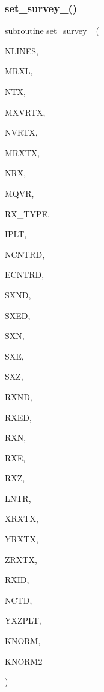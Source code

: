 \subsubsection{\texorpdfstring{set\+\_\+survey\+\_()}{set\_survey\_1()}}
{\footnotesize\ttfamily subroutine set\+\_\+survey\+\_ (\begin{DoxyParamCaption}\item[{integer}]{N\+L\+I\+N\+ES,  }\item[{integer}]{M\+R\+XL,  }\item[{integer}]{N\+TX,  }\item[{integer}]{M\+X\+V\+R\+TX,  }\item[{integer, dimension(ntx)}]{N\+V\+R\+TX,  }\item[{integer}]{M\+R\+X\+TX,  }\item[{integer, dimension (nlines)}]{N\+RX,  }\item[{integer}]{M\+Q\+VR,  }\item[{integer, dimension (nlines)}]{R\+X\+\_\+\+T\+Y\+PE,  }\item[{integer, dimension (nlines)}]{I\+P\+LT,  }\item[{real(kind=ql)}]{N\+C\+N\+T\+RD,  }\item[{real(kind=ql)}]{E\+C\+N\+T\+RD,  }\item[{real(kind=ql), dimension(mxvrtx,ntx)}]{S\+X\+ND,  }\item[{real(kind=ql), dimension(mxvrtx,ntx)}]{S\+X\+ED,  }\item[{real, dimension(mxvrtx,ntx)}]{S\+XN,  }\item[{real, dimension(mxvrtx,ntx)}]{S\+XE,  }\item[{real, dimension(ntx)}]{S\+XZ,  }\item[{real(kind=ql), dimension(mrxl,nlines,mqvr)}]{R\+X\+ND,  }\item[{real(kind=ql), dimension(mrxl,nlines,mqvr)}]{R\+X\+ED,  }\item[{real, dimension(mrxl,nlines,mqvr)}]{R\+XN,  }\item[{real, dimension(mrxl,nlines,mqvr)}]{R\+XE,  }\item[{real, dimension(mrxl,nlines)}]{R\+XZ,  }\item[{integer, dimension(4,nlines)}]{L\+N\+TR,  }\item[{real, dimension(mrxtx,ntx,mqvr)}]{X\+R\+X\+TX,  }\item[{real, dimension(mrxtx,ntx,mqvr)}]{Y\+R\+X\+TX,  }\item[{real, dimension(mrxtx,ntx)}]{Z\+R\+X\+TX,  }\item[{integer, dimension (mrxtx,ntx)}]{R\+X\+ID,  }\item[{integer, dimension (mrxtx,ntx)}]{N\+C\+TD,  }\item[{real(kind=ql), dimension(3,mrxl,nlines)}]{Y\+X\+Z\+P\+LT,  }\item[{integer, dimension (nlines)}]{K\+N\+O\+RM,  }\item[{integer, dimension (mrxtx,ntx)}]{K\+N\+O\+R\+M2 }\end{DoxyParamCaption})}

